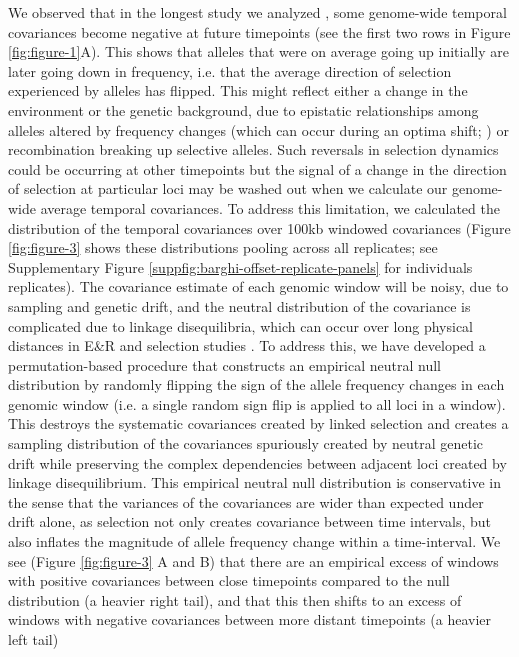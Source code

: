 \documentclass[11pt]{article}
\begin{document}
We observed that in the longest study  we analyzed \parencite{Barghi2019-qy},
some genome-wide temporal covariances become negative at future timepoints (see
the first two rows in Figure \ref{fig:figure-1}A). This shows that alleles that
were on average going up initially are later going down in frequency, i.e.
that the average direction of selection experienced by alleles has flipped.
This might reflect either a change in the environment or the genetic
background, due to epistatic relationships among alleles altered by frequency
changes (which can occur during an optima shift; \cite{Hayward2019-kt}) or
recombination breaking up selective alleles. Such reversals in selection
dynamics could be occurring at other timepoints but the signal of a change in
the direction of selection at particular loci may be washed out when we
calculate our genome-wide average temporal covariances.  To address this
limitation, we calculated the distribution of the temporal covariances over
100kb windowed covariances (Figure \ref{fig:figure-3} shows these distributions
pooling across all replicates; see Supplementary Figure
\ref{suppfig:barghi-offset-replicate-panels} for individuals replicates). The
covariance estimate of each genomic window will be noisy, due to sampling and
genetic drift, and the neutral distribution of the covariance is complicated
due to linkage disequilibria, which can occur over long physical distances in
E\&R and selection studies \parencite{Nuzhdin2013-gf,Baldwin-Brown2014-cl}.  To
address this, we have developed a permutation-based procedure that constructs
an empirical neutral null distribution by randomly flipping the sign of
the allele frequency changes in each genomic window (i.e. a single random sign
flip is applied to all loci in a window). This destroys the systematic
covariances created by linked selection and creates a sampling distribution of
the covariances spuriously created by neutral genetic drift while preserving
the complex dependencies between adjacent loci created by linkage
disequilibrium.  This empirical neutral null distribution is conservative in
the sense that the variances of the covariances are wider than expected under
drift alone, as selection not only creates covariance between time
intervals, but also inflates the magnitude of allele frequency change within a
time-interval.  We see (Figure \ref{fig:figure-3} A and B) that there are an
empirical excess of windows with positive covariances between close timepoints
compared to the null distribution (a heavier right tail), and that this then
shifts to an excess of windows with negative covariances between more distant
timepoints (a heavier left tail)
\end{document}
